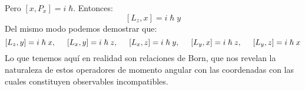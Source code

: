 Pero $[x, P_{x}] = i \; \hbar$. Entonces:
\[ [L_{z}, x] = i \; \hbar \; y \]
Del mismo modo podemos demostrar que:
\[ [L_{z}, y] = i \; \hbar \; x, \hspace{0.5cm} [L_{x}, y] = i \; \hbar \; z, \hspace{0.5cm} [L_{x}, z] = i \; \hbar \; y, \hspace{0.5cm} [L_{y}, x] = i \; \hbar \; z, \hspace{0.5cm} [L_{y}, z] = i \; \hbar \; x \]
Lo que tenemos aquí en realidad son relaciones de Born, que nos revelan la naturaleza de estos operadores de momento angular con las coordenadas con las cuales constituyen observables incompatibles.
\\
\\






